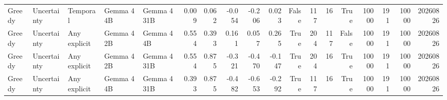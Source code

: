 \begin{tabular}{lllllrrrrrrrrrrrrr}
Greedy & Uncertainty & Temporal & Gemma 4 4B & Gemma 4 31B & 0.009 & 0.062 & -0.054 & -0.206 & 0.023 & False & 117 & 16 & True & 10000 & 191 & 10000 & 20260826 \\
Greedy & Uncertainty & Any explicit & Gemma 4 2B & Gemma 4 4B & 0.554 & 0.393 & 0.161 & 0.057 & 0.265 & True & 204 & 117 & False & 10000 & 191 & 10000 & 20260826 \\
Greedy & Uncertainty & Any explicit & Gemma 4 2B & Gemma 4 31B & 0.554 & 0.875 & -0.321 & -0.470 & -0.147 & True & 204 & 16 & True & 10000 & 191 & 10000 & 20260826 \\
Greedy & Uncertainty & Any explicit & Gemma 4 4B & Gemma 4 31B & 0.393 & 0.875 & -0.482 & -0.653 & -0.292 & True & 117 & 16 & True & 10000 & 191 & 10000 & 20260826 \\
\bottomrule
\end{tabular}
